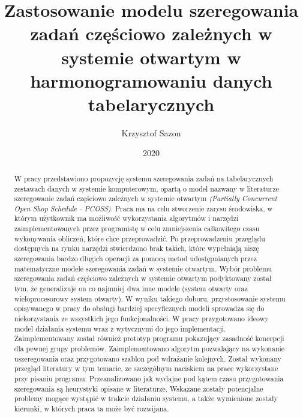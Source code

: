 \documentclass[brudnopis]{xmgr}
\author   {Krzysztof Sazon}
\title    {Zastosowanie modelu szeregowania zadań częściowo zależnych w systemie otwartym w harmonogramowaniu danych tabelarycznych}
\date     {2020}
\begin{document}
\begin{abstract}
W pracy przedstawiono propozycję systemu szeregowania zadań na tabelarycznych zestawach danych w systemie komputerowym, opartą o model nazwany w literaturze szeregowanie zadań częściowo zależnych w systemie otwartym \emph{(Partially Concurrent Open Shop Schedule - PCOSS)}.
Praca ma na celu stworzenie zarysu środowiska, w którym użytkownik ma możliwość wykorzystania algorytmów i narzędzi zaimplementowanych przez programistę w celu zmniejszenia całkowitego czasu wykonywania obliczeń, które chce przeprowadzić.
Po przeprowadzeniu przeglądu dostępnych na rynku narzędzi stwierdzono brak takich, które wypełniają niszę szeregowania bardzo długich operacji za pomocą metod udostępnianych przez matematyczne modele szeregowania zadań w systemie otwartym.
Wybór problemu szeregowania zadań częściowo zależnych w systemie otwartym podyktowany został tym, że generalizuje on co najmniej dwa inne modele (system otwarty oraz wieloprocesorowy system otwarty). W wyniku takiego doboru, przystosowanie systemu opisywanego w pracy do obsługi bardziej specyficznych modeli sprowadza się do niekorzystania ze wszystkich jego funkcjonalności.
W pracy przygotowano ideowy model działania systemu wraz z wytycznymi do jego implementacji.
Zaimplementowany został również prototyp programu pokazujący zasadność koncepcji dla pewnej grupy problemów.
Zaimplementowano algorytm pozwalający na wykonanie uszeregowania oraz przygotowano szablon pod wdrażanie kolejnych.
Został wykonany przegląd literatury w tym temacie, ze szczególnym naciskiem na prace wykorzystane przy pisaniu programu.
Przeanalizowano jak wydajne pod kątem czasu przygotowania szeregowania są heurystyki opisane w literaturze.
Wskazane zostały potencjalne problemy mogące wystąpić w trakcie działaniu systemu, a także wymienione zostały kierunki, w których praca ta może być rozwijana.
\end{abstract}




\maketitle
\end{document}

